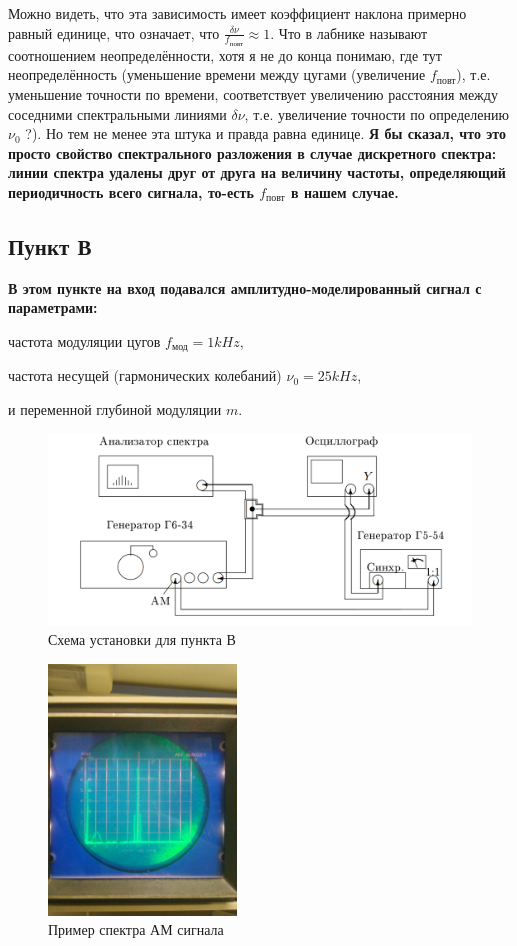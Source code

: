 \documentclass[a4paper,12pt]{article}
\begin{document}
Можно видеть, что эта зависимость имеет коэффициент наклона примерно равный единице, что означает, что $\frac{\delta\nu}{f_\text{повт}} \approx 1$. Что в лабнике называют соотношением неопределённости, хотя я не до конца понимаю, где тут неопределённость (уменьшение времени между цугами (увеличение $f_\text{повт}$), т.е. уменьшение точности по времени, соответствует увеличению расстояния между соседними спектральными линиями $\delta \nu$, т.е. увеличение точности по определению $\nu_0$ ?). Но тем не менее эта штука и правда равна единице. \textbf{Я бы сказал, что это просто свойство спектрального разложения в случае дискретного спектра: линии спектра удалены друг от друга на величину частоты, определяющий периодичность всего сигнала, то-есть $f_\text{повт}$ в нашем случае.}

\bigskip
\newpage
\subsection*{Пункт В}
\bigskip

\textbf{В этом пункте на вход подавался амплитудно-моделированный сигнал с параметрами:}

частота модуляции цугов $f_\text{мод} = 1 kHz$,

частота несущей (гармонических колебаний) $\nu_0 = 25 kHz$,

и переменной глубиной модуляции $m$.

\begin{figure}[htpb]
\centering
\includegraphics[width=160mm]{scheme2.png}
\caption{Схема установки для пункта В }\label{schema}
\end{figure}

\begin{figure}[htpb]
\centering
\includegraphics[width=50mm]{Pictures/C-1.jpg}
\caption{Пример спектра АМ сигнала}
\label{C}
\end{figure}
\end{document}
